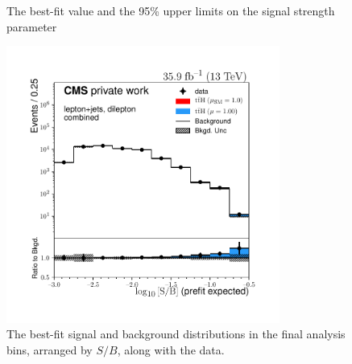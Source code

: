 \begin{figure}
\begin{centering}
\caption[The best-fit value and the 95\% upper limits on the signal strength parameter]{The best-fit value and the 95\% upper limits on the signal strength parameter}
\label{fig:tth_combined}
\end{centering}
\end{figure}

\begin{figure}
\begin{centering}
\includegraphics[width = 0.8\textwidth]{figures/tth/sob.pdf}
\caption[The final analysis bins, arranged by $S/B$.]{The best-fit signal and background distributions in the final analysis bins, arranged by $S/B$, along with the data.}
\label{fig:tth_sob}
\end{centering}
\end{figure}

